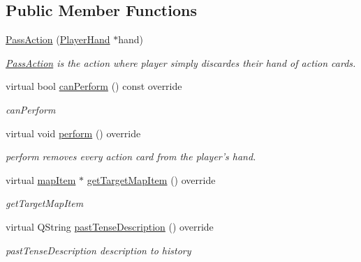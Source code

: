 \subsection*{Public Member Functions}
\begin{DoxyCompactItemize}
\item 
\hyperlink{class_pass_action_a4f6d07b14997166463b1e1a548c8f972}{Pass\-Action} (\hyperlink{class_player_hand}{Player\-Hand} $\ast$hand)
\begin{DoxyCompactList}\small\item\em \hyperlink{class_pass_action}{Pass\-Action} is the action where player simply discardes their hand of action cards. \end{DoxyCompactList}\item 
virtual bool \hyperlink{class_pass_action_ae5d18d95380af6675a7e47323c644a78}{can\-Perform} () const override
\begin{DoxyCompactList}\small\item\em can\-Perform \end{DoxyCompactList}\item 
\hypertarget{class_pass_action_a406c950432ad53505430aa4c4b9baf18}{virtual void \hyperlink{class_pass_action_a406c950432ad53505430aa4c4b9baf18}{perform} () override}\label{class_pass_action_a406c950432ad53505430aa4c4b9baf18}

\begin{DoxyCompactList}\small\item\em perform removes every action card from the player's hand. \end{DoxyCompactList}\item 
virtual \hyperlink{classmap_item}{map\-Item} $\ast$ \hyperlink{class_pass_action_acec5d52148d449d35db2e0f3c53fd5fe}{get\-Target\-Map\-Item} () override
\begin{DoxyCompactList}\small\item\em get\-Target\-Map\-Item \end{DoxyCompactList}\item 
virtual Q\-String \hyperlink{class_pass_action_a88d891a53fc296646e4455abe997a6c8}{past\-Tense\-Description} () override
\begin{DoxyCompactList}\small\item\em past\-Tense\-Description description to history \end{DoxyCompactList}\end{DoxyCompactItemize}


